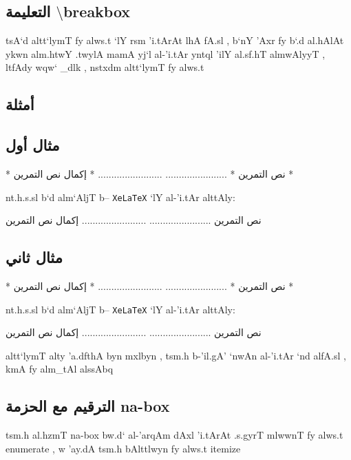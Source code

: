 \documentclass[8pt,a4paper]{article}
\begin{document}
\subsection{التعليمة  \textfrench{$\setminus$breakbox}}
\begin{arab}
tsA`d altt`lymT  \LR{ \verb# \breakbox #}
fy alws.t 
`lY rsm 'i.tArAt lhA fA.sl , b`nY 'Axr fy b`.d al.hAlAt ykwn alm.htwY .twylA mamA yj`l al-'i.tAr yntql 'ilY al.sf.hT almwAlyyT , ltfAdy wqw` _dlk , nstxdm altt`lymT  \LR{ \verb# \breakbox #} fy alws.t 
\end{arab}
\subsection*{أمثلة}
\subsection*{مثال أول}
\begin{arab}
\begin{boxlis}
\begin{nabox}[style=tamryn]
*\textarabic{\bantii
نص التمرين   }*
.......................
........................
\breakbox
*\textarabic{\bantii
إكمال نص التمرين  }*
\end{nabox}
\end{boxlis}
nt.h.s.sl b`d alm`AljT b-- \texttt{XeLaTeX}
`lY al-'i.tAr alttAly:
\end{arab}
\begin{nabox}[style=tamryn]
نص التمرين
.......................
........................
\breakbox
إكمال نص التمرين
\end{nabox}
\subsection*{مثال ثاني}
\begin{arab}
\begin{boxlis}
\begin{nabox}[style=tamryn,notitlebreak]
*\textarabic{\bantii
نص التمرين   }*
.......................
........................
\breakbox
*\textarabic{\bantii
إكمال نص التمرين  }*
\end{nabox}
\end{boxlis}
nt.h.s.sl b`d alm`AljT b-- \texttt{XeLaTeX}
`lY al-'i.tAr alttAly:
\end{arab}
\begin{nabox}[style=tamryn,notitlebreak]
نص التمرين
.......................
........................
\breakbox
إكمال نص التمرين
\end{nabox}
\begin{arab}
altt`lymT 
alty 'a.dfthA byn mxlbyn , tsm.h b-'il.gA'  `nwAn al-'i.tAr `nd alfA.sl , kmA fy alm_tAl alssAbq 
\subsection{الترقيم مع الحزمة \textfrench{na-box}}
tsm.h al.hzmT \textfrench{na-box}
bw.d` al-'arqAm dAxl 'i.tArAt .s.gyrT mlwwnT fy alws.t \textfrench{enumerate} , w 'ay.dA tsm.h bAlttlwyn fy alws.t 
\textfrench{itemize}
\end{arab}
\end{document}
